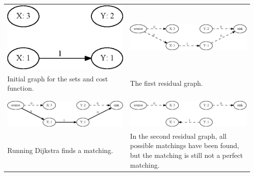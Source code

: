 \documentclass[11pt]{article}
\begin{document}
\begingroup
    \fontsize{7pt}{10pt}\selectfont
\begin{tabular}{ p{5.5cm} | p{5.5cm} }
   \centerline{\includegraphics[scale=0.3]{drawings/eps/TwoWayCostMatchingNotPerfect/1it0.eps}} &
    \centerline{\includegraphics[scale=0.3]{drawings/eps/TwoWayCostMatchingNotPerfect/1it1.eps}} \\
   Initial graph for the sets and cost function. &
    The first residual graph. \\ \\ \hline \\

    \centerline{\includegraphics[scale=0.3]{drawings/eps/TwoWayCostMatchingNotPerfect/1it2.eps}} &
    \centerline{\includegraphics[scale=0.3]{drawings/eps/TwoWayCostMatchingNotPerfect/1it3.eps}} \\
   Running Dijkstra finds a matching. &
   In the second residual graph, all possible matchings have been found, but the matching is still not a perfect matching. \\ 
\end{tabular}
\end{document}
